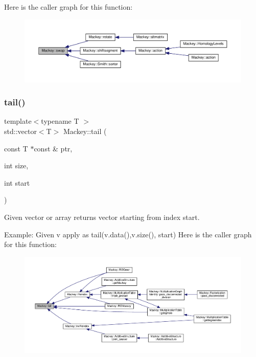 Here is the caller graph for this function\+:\nopagebreak
\begin{figure}[H]
\begin{center}
\leavevmode
\includegraphics[width=350pt]{namespaceMackey_aabed38680919594c4ba5eaa6730a7f82_icgraph}
\end{center}
\end{figure}
\mbox{\label{namespaceMackey_a1e4b11e9d2a5b70f8380af87cae31ef3}} 
\subsubsection{\texorpdfstring{tail()}{tail()}}
{\footnotesize\ttfamily template$<$typename T $>$ \\
std\+::vector$<$T$>$ Mackey\+::tail (\begin{DoxyParamCaption}\item[{const T $\ast$const \&}]{ptr,  }\item[{int}]{size,  }\item[{int}]{start }\end{DoxyParamCaption})\hspace{0.3cm}{\ttfamily [inline]}}



Given vector or array returns vector starting from index start. 

Example\+: Given v apply as tail(v.\+data(),v.\+size(), start) Here is the caller graph for this function\+:\nopagebreak
\begin{figure}[H]
\begin{center}
\leavevmode
\includegraphics[width=350pt]{namespaceMackey_a1e4b11e9d2a5b70f8380af87cae31ef3_icgraph}
\end{center}
\end{figure}
\mbox{\label{namespaceMackey_a671613d53fc3b0c9c4b115bc8b2797e6}} 
